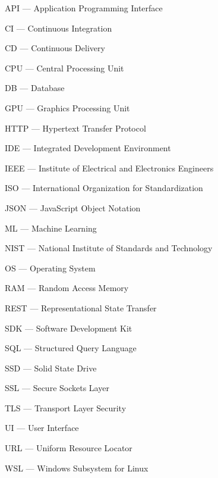 
\hypertarget{api}{API --- Application Programming Interface}

\hypertarget{ci}{CI --- Continuous Integration}

\hypertarget{cd}{CD --- Continuous Delivery}

\hypertarget{cpu}{CPU --- Central Processing Unit}

\hypertarget{db}{DB --- Database}

\hypertarget{gpu}{GPU --- Graphics Processing Unit}

\hypertarget{http}{HTTP --- Hypertext Transfer Protocol}

\hypertarget{ide}{IDE --- Integrated Development Environment}

\hypertarget{ieee}{IEEE --- Institute of Electrical and Electronics Engineers}

\hypertarget{iso}{ISO --- International Organization for Standardization}

\hypertarget{json}{JSON --- JavaScript Object Notation}

\hypertarget{ml}{ML --- Machine Learning}

\hypertarget{nist}{NIST --- National Institute of Standards and Technology}

\hypertarget{os}{OS --- Operating System}

\hypertarget{ram}{RAM --- Random Access Memory}

\hypertarget{rest}{REST --- Representational State Transfer}

\hypertarget{sdk}{SDK --- Software Development Kit}

\hypertarget{sql}{SQL --- Structured Query Language}

\hypertarget{ssd}{SSD --- Solid State Drive}

\hypertarget{ssl}{SSL --- Secure Sockets Layer}

\hypertarget{tls}{TLS --- Transport Layer Security}

\hypertarget{ui}{UI --- User Interface}

\hypertarget{url}{URL --- Uniform Resource Locator}

\hypertarget{wsl}{WSL --- Windows Subsystem for Linux}

\clearpage
